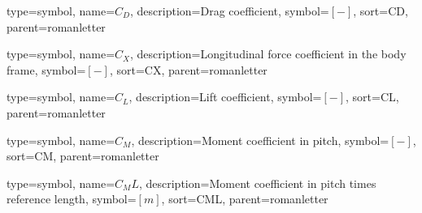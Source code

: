 {
type=symbol, %
name={\ensuremath{C_D}}, %
description={Drag coefficient}, %
symbol={$\left[-\right]$}, %
sort=CD, %
parent=romanletter %
}

{
	type=symbol, %
	name={\ensuremath{C_X}}, %
	description={Longitudinal force coefficient in the body frame}, %
	symbol={$\left[-\right]$}, %
	sort=CX, %
	parent=romanletter %
}


{
type=symbol, %
name={\ensuremath{C_L}}, %
description={Lift coefficient}, %
symbol={$\left[-\right]$}, %
sort=CL, %
parent=romanletter %
}

{
type=symbol, %
name={\ensuremath{C_M}}, %
description={Moment coefficient in pitch}, %
symbol={$\left[-\right]$}, %
sort=CM, %
parent=romanletter %
}

{
	type=symbol, %
	name={\ensuremath{C_ML}}, %
	description={Moment coefficient in pitch times reference length}, %
	symbol={$\left[m\right]$}, %
	sort=CML, %
	parent=romanletter %
}

